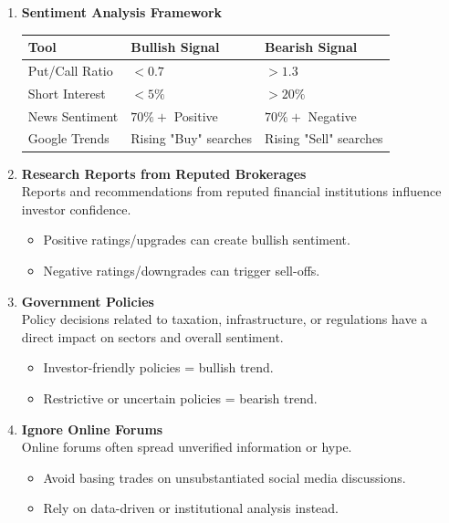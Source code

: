 \documentclass[12pt]{article}
\begin{document}
\begin{enumerate}
    \item \textbf{Sentiment Analysis Framework}
    \begin{center}
    \begin{tabular}{|l|l|l|}
    \hline
    \textbf{Tool} & \textbf{Bullish Signal} & \textbf{Bearish Signal} \\ \hline
    Put/Call Ratio & $<0.7$ & $>1.3$ \\ \hline
    Short Interest & $<5\%$ & $>20\%$ \\ \hline
    News Sentiment & $70\%+$ Positive & $70\%+$ Negative \\ \hline
    Google Trends & Rising "Buy" searches & Rising "Sell" searches \\ \hline
    \end{tabular}
    \end{center}

    \item \textbf{Research Reports from Reputed Brokerages}\\
    Reports and recommendations from reputed financial institutions influence investor confidence.
    \begin{itemize}
        \item Positive ratings/upgrades can create bullish sentiment.
        \item Negative ratings/downgrades can trigger sell-offs.
    \end{itemize}

    \item \textbf{Government Policies}\\
    Policy decisions related to taxation, infrastructure, or regulations have a direct impact on sectors and overall sentiment.
    \begin{itemize}
        \item Investor-friendly policies = bullish trend.
        \item Restrictive or uncertain policies = bearish trend.
    \end{itemize}

    \item \textbf{Ignore Online Forums}\\
    Online forums often spread unverified information or hype.
    \begin{itemize}
        \item Avoid basing trades on unsubstantiated social media discussions.
        \item Rely on data-driven or institutional analysis instead.
    \end{itemize}


\end{enumerate}
\end{document}
